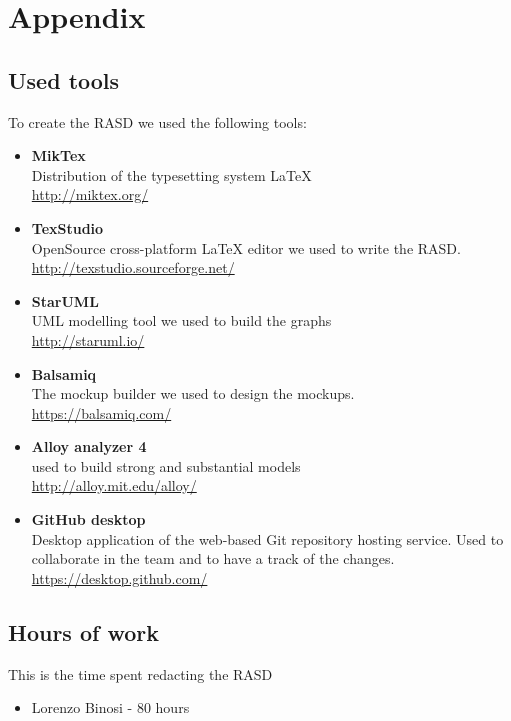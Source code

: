 \section{Appendix}
\subsection{Used tools}
To create the RASD we used the following tools:
\begin{itemize}
	\item \textbf{MikTex} \\ Distribution of the typesetting system LaTeX \\ \url{http://miktex.org/} 
	\item \textbf{TexStudio}\\ OpenSource cross-platform LaTeX editor we used to write the RASD. \\ \url{http://texstudio.sourceforge.net/} 
	\item \textbf{StarUML}\\ UML modelling tool we used to build the graphs\\ \url{http://staruml.io/} 
	\item \textbf{Balsamiq}\\ The mockup builder we used to design the mockups. \\ \url{https://balsamiq.com/} 
	\item \textbf{Alloy analyzer 4}\\ used to build  strong and substantial models \\ \url{ http://alloy.mit.edu/alloy/}
	\item \textbf{GitHub desktop}\\ Desktop application of the web-based Git repository hosting service. Used to collaborate in the team and to have a track of the changes.  \\ \url{https://desktop.github.com/} 
\end{itemize}


\subsection{Hours of work}
This is the time spent redacting the RASD
\begin{itemize}
	\item {Lorenzo Binosi} - 80 hours
\end{itemize}

